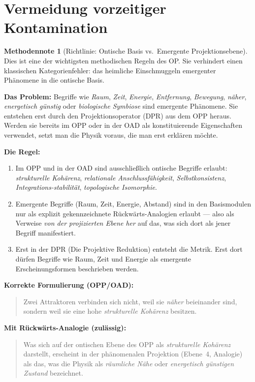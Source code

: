 \documentclass[11pt,a4paper]{article}
\theoremstyle{plain}
\theoremstyle{definition}
\newtheorem{methodennote}{Methodennote}[section]
\begin{document}
\section{Vermeidung vorzeitiger Kontamination}

\begin{methodennote}[Richtlinie: Ontische Basis vs.\ Emergente Projektionsebene]
Dies ist eine der wichtigsten methodischen Regeln des OP. Sie verhindert
einen klassischen Kategorienfehler: das heimliche Einschmuggeln emergenter
Ph\"{a}nomene in die ontische Basis.

\textbf{Das Problem:} Begriffe wie \emph{Raum}, \emph{Zeit}, \emph{Energie},
\emph{Entfernung}, \emph{Bewegung}, \emph{n\"{a}her}, \emph{energetisch
g\"{u}nstig} oder \emph{biologische Symbiose} sind emergente Ph\"{a}nomene.
Sie entstehen erst durch den Projektionsoperator (DPR) aus dem OPP heraus.
Werden sie bereits im OPP oder in der OAD als konstituierende Eigenschaften
verwendet, setzt man die Physik voraus, die man erst erkl\"{a}ren m\"{o}chte.

\textbf{Die Regel:}
\begin{enumerate}
  \item Im OPP und in der OAD sind ausschlie\ss{}lich ontische Begriffe
        erlaubt: \emph{strukturelle Koh\"{a}renz}, \emph{relationale
        Anschlussfähigkeit}, \emph{Selbstkonsistenz}, \emph{Integrations-stabilit\"{a}t},
        \emph{topologische Isomorphie}.
  \item Emergente Begriffe (Raum, Zeit, Energie, Abstand) sind in den
        Basismodulen nur als explizit gekennzeichnete R\"{u}ckw\"{a}rts-Analogien
        erlaubt --- also als Verweise \emph{von der projizierten Ebene her}
        auf das, was sich dort als jener Begriff manifestiert.
  \item Erst in der DPR (Die Projektive Reduktion) entsteht die Metrik.
        Erst dort d\"{u}rfen Begriffe wie Raum, Zeit und Energie als
        emergente Erscheinungsformen beschrieben werden.
\end{enumerate}

\textbf{Korrekte Formulierung (OPP/OAD):}
\begin{quote}
\glqq{}Zwei Attraktoren verbinden sich nicht, weil sie \emph{n\"{a}her}
beieinander sind, sondern weil sie eine hohe \emph{strukturelle Koh\"{a}renz}
besitzen.\grqq{}
\end{quote}

\textbf{Mit R\"{u}ckw\"{a}rts-Analogie (zul\"{a}ssig):}
\begin{quote}
\glqq{}Was sich auf der ontischen Ebene des OPP als \emph{strukturelle
Koh\"{a}renz} darstellt, erscheint in der ph\"{a}nomenalen Projektion
(Ebene~4, Analogie) als das, was die Physik als \emph{r\"{a}umliche N\"{a}he}
oder \emph{energetisch g\"{u}nstigen Zustand} bezeichnet.\grqq{}
\end{quote}
\end{methodennote}
\end{document}

